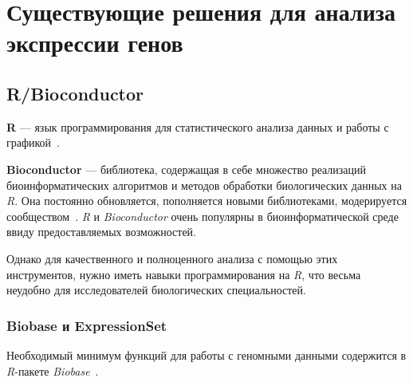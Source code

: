 \section{Существующие решения для анализа экспрессии генов}
\subsection{R/Bioconductor}
\textbf{R} --- язык программирования для статистического анализа данных и работы с графикой~\cite{rproject}.

\textbf{Bioconductor} --- библиотека, содержащая в себе множество реализаций биоинформатических алгоритмов и методов обработки биологических данных на \emph{R}. Она постоянно обновляется, пополняется новыми библиотеками, модерируется сообществом~\cite{biobase}. \emph{R} и \emph{Bioconductor} очень популярны в биоинформатической среде ввиду предоставляемых возможностей.

Однако для качественного и полноценного анализа с помощью этих инструментов, нужно иметь навыки программирования на \emph{R}, что весьма неудобно для исследователей биологических специальностей.

\subsubsection{Biobase и ExpressionSet}
Необходимый минимум функций для работы с геномными данными содержится в \emph{R}-пакете \emph{Biobase}~\cite{biobase}.

